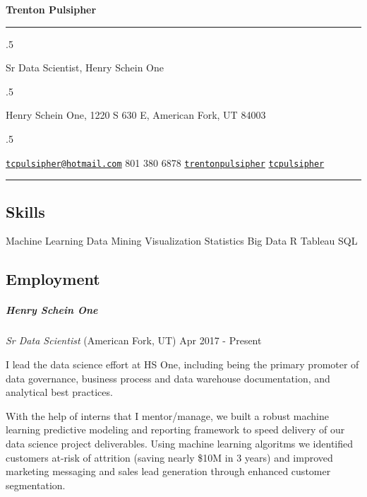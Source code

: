 \documentclass[11pt,]{article}
\let\oldsubparagraph\subparagraph
\renewcommand{\subparagraph}[1]{\oldsubparagraph{#1}\mbox{}}
\begin{document}
\centerline{\huge \bf Trenton Pulsipher}

\vspace{2 mm}

\hrule

\vspace{2 mm}

\moveleft.5\hoffset\centerline{Sr Data Scientist, Henry Schein One}
\moveleft.5\hoffset\centerline{Henry Schein One, 1220 S 630 E, American Fork, UT 84003}
\moveleft.5\hoffset\centerline{ \faEnvelopeO \hspace{1 mm} \href{mailto:}{\tt \href{mailto:tcpulsipher@hotmail.com}{\nolinkurl{tcpulsipher@hotmail.com}}} \hspace{1 mm}  \faPhone 
\hspace{1 mm}  801 380 6878  \hspace{1 mm}  
\faGithub \hspace{1 mm} \href{http://github.com/trentonpulsipher}{\tt trentonpulsipher} \hspace{1 mm}     \faLinkedin \hspace{1 mm} \href{http://www.linkedin.com/in/tcpulsipher}{\tt tcpulsipher}   }

\vspace{2 mm}

\hrule


\subsection{Skills}\label{skills}

Machine Learning \textbar{} Data Mining \textbar{} Visualization
\textbar{} Statistics \textbar{} Big Data \textbar{} R \textbar{}
Tableau \textbar{} SQL

\subsection{Employment}\label{employment}

\subparagraph{Henry Schein One}\label{henry-schein-one}

\emph{Sr Data Scientist} (American Fork, UT) \hfill Apr 2017 - Present

I lead the data science effort at HS One, including being the primary
promoter of data governance, business process and data warehouse
documentation, and analytical best practices.

With the help of interns that I mentor/manage, we built a robust machine
learning predictive modeling and reporting framework to speed delivery
of our data science project deliverables. Using machine learning
algoritms we identified customers at-risk of attrition (saving nearly
\$10M in 3 years) and improved marketing messaging and sales lead
generation through enhanced customer segmentation.
\end{document}
